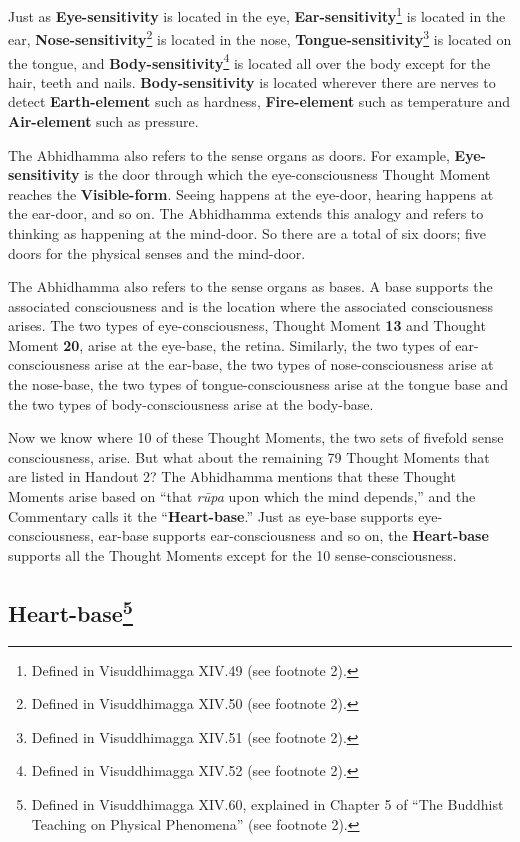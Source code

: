 Just as \textbf{Eye-sensitivity} is located in the eye, \textbf{Ear-sensitivity}\footnote{Defined in Visuddhimagga XIV.49 (see footnote 2).} is located in the ear, \textbf{Nose-sensitivity}\footnote{Defined in Visuddhimagga XIV.50 (see footnote 2).} is located in the nose, \textbf{Tongue-sensitivity}\footnote{Defined in Visuddhimagga XIV.51 (see footnote 2).} is located on the tongue, and \textbf{Body-sensitivity}\footnote{Defined in Visuddhimagga XIV.52 (see footnote 2).} is located all over the body except for the hair, teeth and nails. \textbf{Body-sensitivity} is located wherever there are nerves to detect \textbf{Earth-element} such as hardness, \textbf{Fire-element} such as temperature and \textbf{Air-element} such as pressure.

The Abhidhamma also refers to the sense organs as doors. For example, \textbf{Eye-sensitivity} is the door through which the eye-consciousness Thought Moment reaches the \textbf{Visible-form}. Seeing happens at the eye-door, hearing happens at the ear-door, and so on. The Abhidhamma extends this analogy and refers to thinking as happening at the mind-door. So there are a total of six doors; five doors for the physical senses and the mind-door.

The Abhidhamma also refers to the sense organs as bases. A base supports the associated consciousness and is the location where the associated consciousness arises. The two types of eye-consciousness, Thought Moment \textbf{13} and Thought Moment \textbf{20}, arise at the eye-base, the retina. Similarly, the two types of ear-consciousness arise at the ear-base, the two types of nose-consciousness arise at the nose-base, the two types of tongue-consciousness arise at the tongue base and the two types of body-consciousness arise at the body-base.

Now we know where 10 of these Thought Moments, the two sets of fivefold sense consciousness, arise. But what about the remaining 79 Thought Moments that are listed in Handout 2? The Abhidhamma mentions that these Thought Moments arise based on “that \textit{rūpa} upon which the mind depends,” and the Commentary calls it the “\textbf{Heart-base}.” Just as eye-base supports eye-consciousness, ear-base supports ear-consciousness and so on, the \textbf{Heart-base} supports all the Thought Moments except for the 10 sense-consciousness.

\subsection*{Heart-base\footnote{Defined in Visuddhimagga XIV.60, explained in Chapter 5 of “The Buddhist Teaching on Physical Phenomena” (see footnote 2).}}

